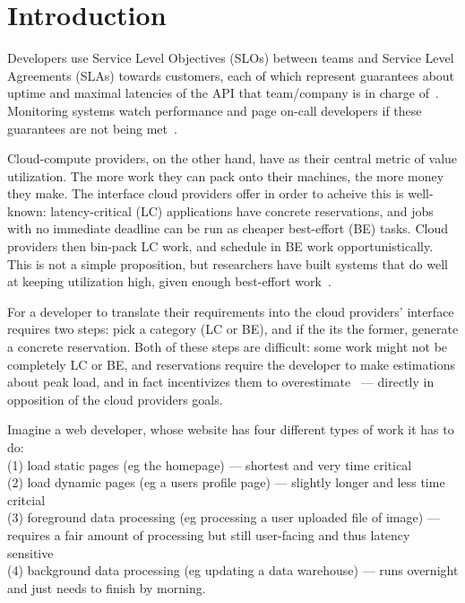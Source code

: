 \section{Introduction}

Developers use Service Level Objectives (SLOs) between teams and Service Level
Agreements (SLAs) towards customers, each of which represent guarantees about
uptime and maximal latencies of the API that team/company is in charge
of~\cite{awssla}. Monitoring systems watch performance and page on-call
developers if these guarantees are not being met~\cite{cloudwatch}.

Cloud-compute providers, on the other hand, have as their central metric of
value utilization. The more work they can pack onto their machines, the more
money they make. The interface cloud providers offer in order to acheive this is
well-known: latency-critical (LC) applications have concrete reservations, and
jobs with no immediate deadline can be run as cheaper best-effort (BE) tasks.
Cloud providers then bin-pack LC work, and schedule in BE work
opportunistically. This is not a simple proposition, but researchers have built
systems that do well at keeping utilization high, given enough best-effort
work~\cite{caladan}.


For a developer to translate their requirements into the cloud providers'
interface requires two steps: pick a category (LC or BE), and if the its the
former, generate a concrete reservation. Both of these steps are difficult: some
work might not be completely LC or BE, and reservations require the developer to
make estimations about peak load, and in fact incentivizes them to
overestimate~\cite*{overprovision} --- directly in opposition of the cloud
providers goals.

Imagine a web developer, whose website has four different types of work it has
to do: \\
(1) load static pages (eg the homepage) --- shortest and very time critical \\
(2) load dynamic pages (eg a users profile page) --- slightly longer and less
time critcial \\
(3) foreground data processing (eg processing a user uploaded file of image) ---
requires a fair amount of processing but still user-facing and thus latency
sensitive \\
(4) background data processing (eg updating a data warehouse) --- runs overnight
and just needs to finish by morning.

